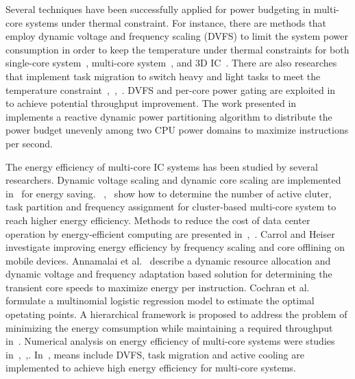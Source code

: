 Several techniques have been successfully applied for power budgeting in multi-core systems under thermal constraint. For instance, there are methods that employ dynamic voltage and frequency scaling (DVFS) to limit the system power consumption in order to keep the temperature under thermal constraints for both single-core system~\cite{Skadron:MICRO'03}, multi-core system~\cite{Jayaseelan:ICCAD'09}, and 3D IC~\cite{Coskun:DATE'09}. There are also researches that implement task migration to switch heavy and light tasks to meet the temperature constraint~\cite{Ge:DAC'10},~\cite{Chantem:TVLSI'11},~\cite{Liu:DATE'12}. DVFS and per-core power gating are exploited in~\cite{Lee:TVLSI'12} to achieve potential throughput improvement. The work presented in~\cite{Kultursay:CHSCSS'12} implements a reactive dynamic power partitioning 
algorithm to distribute the power budget unevenly among two CPU power domains to maximize instructions per second. %

The energy efficiency of multi-core IC systems has been studied by several researchers. Dynamic voltage scaling and dynamic core scaling are implemented in~\cite{Seo:TPDS'08} for energy saving. ~\cite{Majzoub:TCAD'10},~\cite{Kong:DATE'11} show how to determine the number of active cluter, task partition and frequency assignment for cluster-based multi-core system to reach higher energy efficiency. Methods to reduce the cost of data center operation by energy-efficient computing are presented in~\cite{Pedram:TCAD'12},~\cite{Wang:access'17}. Carrol and Heiser~\cite{Carroll:RTAS'14} investigate improving energy efficiency by frequency scaling and core offlining on mobile devices. Annamalai et al.~\cite{Annamalai:ISVLSI'14} describe a dynamic resource allocation and dynamic voltage and frequency adaptation based solution for determining the transient core speeds to maximize energy per instruction. Cochran et al.~\cite{Cochran:ICCAD'11} formulate a multinomial logistic regression model to estimate the optimal opetating points. A hierarchical framework is proposed to address the problem of minimizing the energy comsumption while maintaining a required throughput in~\cite{Ghasemazar:ISCAS'10}. Numerical analysis on energy efficiency of multi-core systems were studies in~\cite{Woo:Computer'08},~\cite{Hill:Computer'08},\cite{Sun:JPDC'10}. In~\cite{Hanumaiah:TCOMP'14}, means include DVFS, task migration and active cooling are implemented to achieve high energy efficiency for multi-core systems.

